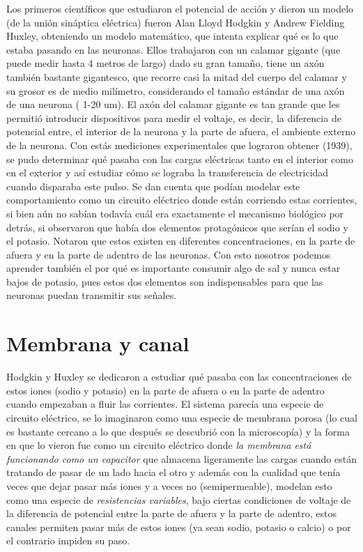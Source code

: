 Los primeros científicos que estudiaron el potencial de acción y dieron un modelo (de la unión sináptica eléctrica)  fueron Alan Lloyd Hodgkin y Andrew Fielding Huxley, 
obteniendo un modelo matemático, que intenta explicar qué es lo que estaba pasando en las neuronas. Ellos trabajaron con un calamar gigante (que puede medir hasta 4 metros de largo) dado su gran tamaño, tiene un axón también bastante gigantesco, que recorre casi la mitad del cuerpo del calamar y su grosor es de medio milímetro, considerando el tamaño estándar de una axón de una neurona ( 1-20 um). El axón del calamar gigante es tan grande que les permitió introducir dispositivos para medir el voltaje, es decir, la diferencia de potencial entre, el interior de la neurona y la parte de afuera, el ambiente externo de la neurona. Con estás mediciones experimentales que lograron obtener (1939), se pudo determinar qué pasaba con las cargas eléctricas tanto en el interior como en el exterior y así estudiar cómo se lograba la transferencia de electricidad cuando disparaba este pulso. 
 Se dan cuenta que podían modelar este comportamiento como un circuito eléctrico donde están corriendo estas corrientes, si bien aún no sabían todavía cuál era exactamente el mecanismo biológico por detrás, si observaron que había dos elementos protagónicos que serían el sodio y el potasio.
 Notaron que estos existen en diferentes concentraciones, en la parte de afuera y en la parte de adentro de las neuronas. Con esto nosotros podemos aprender también el por qué es importante consumir algo de sal y nunca estar bajos de potasio, pues estos dos elementos son indispensables para que las neuronas puedan transmitir sus señales. 

\section{Membrana y canal}

Hodgkin y Huxley se dedicaron a estudiar qué pasaba con las concentraciones de estos iones (sodio y potasio) en la parte de afuera o en la parte de adentro cuando empezaban a fluir las corrientes. El sistema parecía una especie de circuito eléctrico, se lo imaginaron como una especie de membrana porosa (lo cual es bastante cercano a lo que después se descubrió  con la microscopía) y la forma en que lo vieron fue como un circuito eléctrico donde  \textit{la membrana está funcionando como un capacitor} que almacena ligeramente las cargas cuando están tratando de pasar de un lado hacia el otro y además con la cualidad que tenía veces que dejar pasar más iones y a veces no (semipermeable), modelan esto como una especie de \textit{resistencias variables}, bajo ciertas condiciones de voltaje de la diferencia de potencial entre la parte de afuera y la parte de adentro, estos canales permiten pasar más de estos iones (ya sean sodio, potasio o calcio) o por el contrario impiden su paso.

